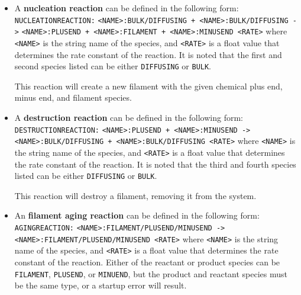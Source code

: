 \documentclass[11pt, oneside]{article}   	%
\begin{document}
\begin{itemize}
\item A \textbf{nucleation reaction} can be defined in the following form:\newline\newline
\texttt{NUCLEATIONREACTION:}\newline
\texttt{<NAME>:BULK/DIFFUSING + <NAME>:BULK/DIFFUSING ->}\newline
\texttt{<NAME>:PLUSEND + <NAME>:FILAMENT + <NAME>:MINUSEND <RATE>}\newline\newline
where \texttt{<NAME>} is the string name of the species, and \texttt{<RATE>} is a float value that determines the rate constant of the reaction. It is noted that the first and second species listed can be either \texttt{DIFFUSING} or \texttt{BULK}.

This reaction will create a new filament with the given chemical plus end, minus end, and filament species.

\item A \textbf{destruction reaction} can be defined in the following form:\newline\newline
\texttt{DESTRUCTIONREACTION:}\newline
\texttt{<NAME>:PLUSEND + <NAME>:MINUSEND ->}\newline
\texttt{<NAME>:BULK/DIFFUSING + <NAME>:BULK/DIFFUSING <RATE>}\newline\newline
where \texttt{<NAME>} is the string name of the species, and \texttt{<RATE>} is a float value that determines the rate constant of the reaction. It is noted that the third and fourth species listed can be either \texttt{DIFFUSING} or \texttt{BULK}.

This reaction will destroy a filament, removing it from the system.

\item An \textbf{filament aging reaction} can be defined in the following form:\newline\newline
\texttt{AGINGREACTION:}\newline
\texttt{<NAME>:FILAMENT/PLUSEND/MINUSEND ->}\newline
\texttt{<NAME>:FILAMENT/PLUSEND/MINUSEND <RATE>}\newline\newline
where \texttt{<NAME>} is the string name of the species, and \texttt{<RATE>} is a float value that determines the rate constant of the reaction. Either of the reactant or product species can be \texttt{FILAMENT}, \texttt{PLUSEND}, or \texttt{MINUEND}, but the product and reactant species must be the same type, or a startup error will result.


\end{itemize}
\end{document}
